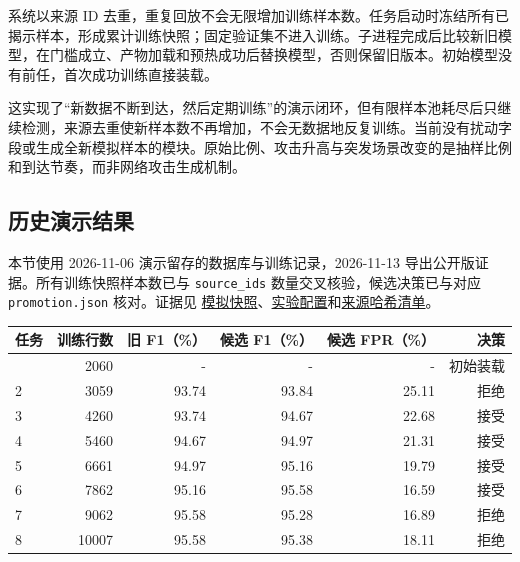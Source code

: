 \documentclass[UTF8,a4paper,11pt,fontset=fandol]{ctexart}
\newcounter{none}
\begin{document}
系统以来源 ID
去重，重复回放不会无限增加训练样本数。任务启动时冻结所有已揭示样本，形成累计训练快照；固定验证集不进入训练。子进程完成后比较新旧模型，在门槛成立、产物加载和预热成功后替换模型，否则保留旧版本。初始模型没有前任，首次成功训练直接装载。

这实现了``新数据不断到达，然后定期训练''的演示闭环，但有限样本池耗尽后只继续检测，来源去重使新样本数不再增加，不会无数据地反复训练。当前没有扰动字段或生成全新模拟样本的模块。原始比例、攻击升高与突发场景改变的是抽样比例和到达节奏，而非网络攻击生成机制。

\subsection{历史演示结果}\label{ux5386ux53f2ux6f14ux793aux7ed3ux679c}

本节使用 2026-11-06 演示留存的数据库与训练记录，2026-11-13
导出公开版证据。所有训练快照样本数已与 \texttt{source\_ids}
数量交叉核验，候选决策已与对应 \texttt{promotion.json} 核对。证据见
\href{https://github.com/ZureTz/ml-network-intrusion-detection/blob/master/reports/results/simulation-20261106/snapshot.json}{模拟快照}、\href{https://github.com/ZureTz/ml-network-intrusion-detection/blob/master/reports/results/simulation-20261106/experiment.json}{实验配置}和\href{https://github.com/ZureTz/ml-network-intrusion-detection/blob/master/reports/results/simulation-20261106/export_manifest.json}{来源哈希清单}。


{\def\LTcaptype{none} %
\begin{longtable}[]{@{}lrrrrr@{}}
\toprule\noalign{}
任务 & 训练行数 & 旧 F1（\%） & 候选 F1（\%） & 候选 FPR（\%） & 决策 \\
\midrule\noalign{}
\endhead
\bottomrule\noalign{}
\endlastfoot
1 & 2060 & - & - & - & 初始装载 \\
2 & 3059 & 93.74 & 93.84 & 25.11 & 拒绝 \\
3 & 4260 & 93.74 & 94.67 & 22.68 & 接受 \\
4 & 5460 & 94.67 & 94.97 & 21.31 & 接受 \\
5 & 6661 & 94.97 & 95.16 & 19.79 & 接受 \\
6 & 7862 & 95.16 & 95.58 & 16.59 & 接受 \\
7 & 9062 & 95.58 & 95.28 & 16.89 & 拒绝 \\
8 & 10007 & 95.58 & 95.38 & 18.11 & 拒绝 \\
\end{longtable}
}
\end{document}
